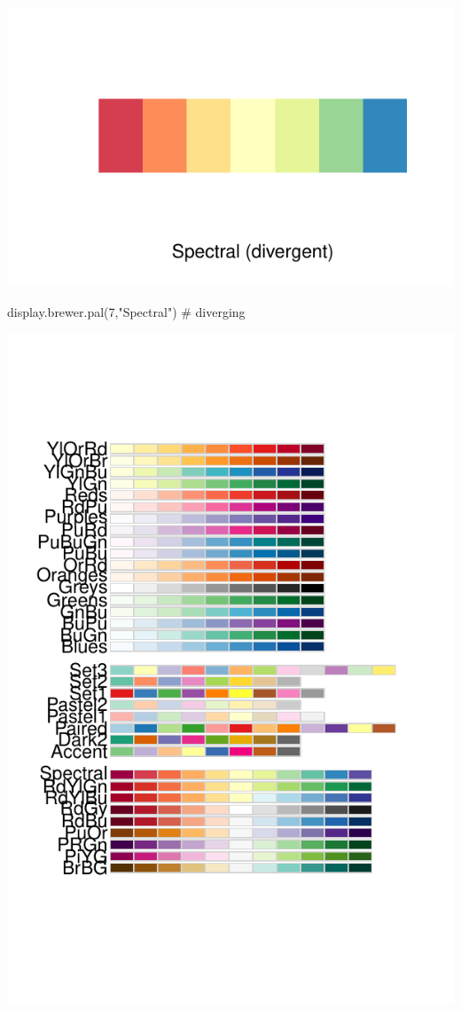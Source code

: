 \documentclass[]{article}
\newenvironment{Shaded}{}{}
\newcommand{\CommentTok}[1]{\textcolor[rgb]{0.00,0.50,0.00}{#1}}
\newcommand{\DecValTok}[1]{#1}
\newcommand{\KeywordTok}[1]{\textcolor[rgb]{0.00,0.00,1.00}{#1}}
\newcommand{\NormalTok}[1]{#1}
\newcommand{\StringTok}[1]{\textcolor[rgb]{0.00,0.50,0.50}{#1}}
\begin{document}
\includegraphics{design_files/figure-latex/unnamed-chunk-4-1.pdf}

\begin{Shaded}
\begin{Highlighting}[]
\KeywordTok{display.brewer.pal}\NormalTok{(}\DecValTok{7}\NormalTok{,}\StringTok{"Spectral"}\NormalTok{) }\CommentTok{# diverging}
\end{Highlighting}
\end{Shaded}

\includegraphics{design_files/figure-latex/unnamed-chunk-5-1.pdf}
\end{document}
